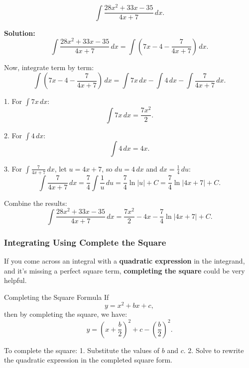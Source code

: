 \documentclass[12pt]{article}
\theoremstyle{beautifulthm}
\begin{document}
\begin{tcolorbox}[colback=examplebg, colframe=red!75!black, title=\textbf{EXAMPLE 2: Find the Integral of the Function}, fonttitle=\bfseries, sharp corners]

\[
\int \frac{28x^2 + 33x - 35}{4x + 7} \, dx.
\]

\tcblower
\textbf{Solution:} 
\[
\int \frac{28x^2 + 33x - 35}{4x + 7} \, dx = \int (7x - 4 - \frac{7}{4x + 7}) \, dx.
\]

Now, integrate term by term:
\[
\int (7x - 4 - \frac{7}{4x + 7}) \, dx = \int 7x \, dx - \int 4 \, dx - \int \frac{7}{4x + 7} \, dx.
\]

1. For $\int 7x \, dx$:
\[
\int 7x \, dx = \frac{7x^2}{2}.
\]

2. For $\int 4 \, dx$:
\[
\int 4 \, dx = 4x.
\]

3. For $\int \frac{7}{4x + 7} \, dx$, let $u = 4x + 7$, so $du = 4 \, dx$ and $dx = \frac{1}{4} \, du$:
\[
\int \frac{7}{4x + 7} \, dx = \frac{7}{4} \int \frac{1}{u} \, du = \frac{7}{4} \ln|u| + C = \frac{7}{4} \ln|4x + 7| + C.
\]

Combine the results:
\[
\int \frac{28x^2 + 33x - 35}{4x + 7} \, dx = \frac{7x^2}{2} - 4x - \frac{7}{4} \ln|4x + 7| + C.
\]
\end{tcolorbox}


\newpage
\subsubsection{Integrating Using Complete the Square}
If you come across an integral with a \textbf{quadratic expression} in the integrand, and it's missing a perfect square term, \textbf{completing the square} could be very helpful.

\begin{mytheorem}{Completing the Square Formula}{}
    If 
\[
y = x^2 + bx + c,
\]
then by completing the square, we have:
\[
y = \left(x + \frac{b}{2}\right)^2 + c - \left(\frac{b}{2}\right)^2.
\]

To complete the square:
1. Substitute the values of \(b\) and \(c\).
2. Solve to rewrite the quadratic expression in the completed square form.
\end{mytheorem}
\end{document}
